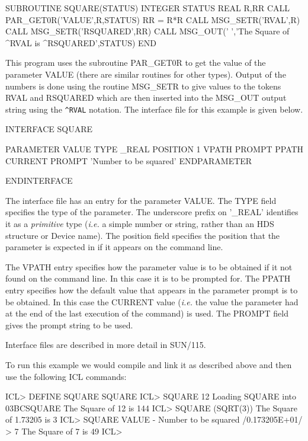 \documentclass[twoside,11pt,nolof,chapters]{starlink}
\begin{document}
\begin{terminalv}
      SUBROUTINE SQUARE(STATUS)
      INTEGER STATUS
      REAL R,RR
      CALL PAR_GET0R('VALUE',R,STATUS)
      RR = R*R
      CALL MSG_SETR('RVAL',R)
      CALL MSG_SETR('RSQUARED',RR)
      CALL MSG_OUT(' ','The Square of ^RVAL is ^RSQUARED',STATUS)
      END
\end{terminalv}

This program uses the subroutine PAR\_GET0R to get the value of the parameter
VALUE (there are similar routines for other types). Output of the numbers
is done using the routine MSG\_SETR to give values to the tokens RVAL and
RSQUARED which are then inserted into the MSG\_OUT output string using
the \verb$^RVAL$ notation. The interface file for this example is given
below.

\begin{terminalv}
  INTERFACE SQUARE

    PARAMETER VALUE
      TYPE _REAL
      POSITION 1
      VPATH PROMPT
      PPATH CURRENT
      PROMPT 'Number to be squared'
    ENDPARAMETER

  ENDINTERFACE
\end{terminalv}

The interface file has an entry for the parameter VALUE. The TYPE field
specifies the type of the parameter. The underscore prefix on '\_REAL'
identifies it as a \emph{primitive} type (\emph{i.e.} a simple number or string,
rather than an HDS structure or Device name). The position field specifies
the position that the parameter is expected in if it appears on the command
line.

The VPATH entry specifies how the parameter value is to be obtained if it
not found on the command line. In this case it is to be prompted for. The
PPATH entry specifies how the default value that appears in the parameter
prompt is to be obtained. In this case the CURRENT value (\emph{i.e.} the value
the parameter had at the end of the last execution of the command) is used.
The PROMPT field gives the prompt string to be used.

Interface files are described in more detail in SUN/115.

To run this example we would compile and link it as described above and
then use the following ICL commands:

\begin{terminalv}
    ICL> DEFINE SQUARE SQUARE
    ICL> SQUARE 12
    Loading SQUARE into 03BCSQUARE
    The Square of 12 is 144
    ICL> SQUARE (SQRT(3))
    The Square of 1.73205 is 3
    ICL> SQUARE
    VALUE - Number to be squared /0.173205E+01/ > 7
    The Square of 7 is 49
    ICL>
\end{terminalv}
\end{document}
